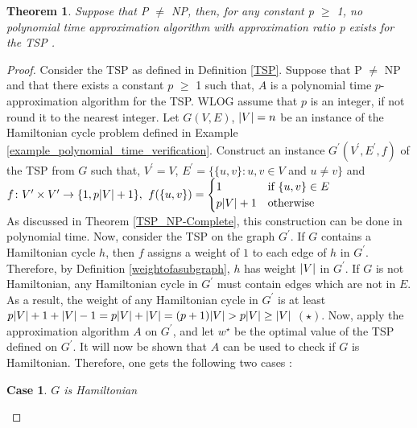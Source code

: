 \documentclass[12pt]{article}
\newtheorem{theorem}[definition]{Theorem}
\newtheorem{case}{Case}
\numberwithin{equation}{subsection}
\numberwithin{table}{subsection}
\numberwithin{algorithm}{subsection}
\numberwithin{figure}{subsection}
\begin{document}
\begin{theorem}
Suppose that P $\neq$ NP, then, for any constant p $\geq$ 1, no polynomial time approximation algorithm with approximation ratio p exists for the TSP {}.
\label{no_approx_tsp}
\end{theorem}
\begin{proof}
Consider the TSP as defined in Definition \ref{TSP}. Suppose that P $\neq$ NP and that there exists a constant $p$ $\geq$ 1 such that, $A$ is a polynomial time $p$-approximation algorithm for the TSP. WLOG assume that $p$ is an integer, if not round it to the nearest integer. Let $G(V,E)$, $\abs{V} = n$ be an instance of the Hamiltonian cycle problem defined in Example \ref{example_polynomial_time_verification}. Construct an instance $G^\prime(V^\prime,E^\prime,f)$ of the TSP from $G$ such that, $V^\prime = V$, $E^\prime = \{ \{u, v\} : u, v \in V$ and $u \neq v\}$ and \\ 
$f\colon V^\prime \times V^\prime \to \{1, p\abs{V} + 1\},$ $f(\{u, v\}) = \begin{cases} 1& \text{if } \{u, v\} \in E\\ p\abs{V} + 1              & \text{otherwise} \end{cases}$\\
As discussed in Theorem \ref{TSP_NP-Complete}, this construction can be done in polynomial time. Now, consider the TSP on the graph $G^\prime$. If $G$ contains a Hamiltonian cycle $h$, then $f$ assigns a weight of $1$ to each edge of $h$ in $G^\prime$. Therefore, by Definition \ref{weightofasubgraph}, $h$ has weight $\abs{V}$ in $G^\prime$. If $G$ is not Hamiltonian, any Hamiltonian cycle in $G^\prime$ must contain edges which are not in $E$. As a result, the weight of any Hamiltonian cycle in $G^\prime$ is at least $p\abs{V} + 1 + \abs{V} - 1 = p\abs{V} + \abs{V} = (p+1)\abs{V} > p\abs{V} \geq \abs{V}$ $(\star)$.  Now, apply the approximation algorithm $A$ on $G^\prime$, and let $w^\star$ be the optimal value of the TSP defined on $G^\prime$. It will now be shown that $A$ can be used to check if $G$ is Hamiltonian. Therefore, one gets the following two cases : 
\begin{case}
\label{case1}
$G$ is Hamiltonian 
\end{case}

\end{proof}
\end{document}
